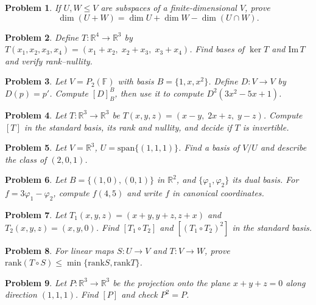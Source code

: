 \documentclass[11pt]{article}
\theoremstyle{upright}
\newtheorem{problem}{Problem}
\begin{document}
\begin{problem}
If $U,W\le V$ are subspaces of a finite-dimensional $V$, prove
\[
\dim(U+W)=\dim U+\dim W-\dim(U\cap W).
\]
\end{problem}

\begin{problem}
Define $T:\mathbb{R}^4\to\mathbb{R}^3$ by $T(x_1,x_2,x_3,x_4)=(x_1+x_2,\;x_2+x_3,\;x_3+x_4)$. 
Find bases of $\ker T$ and $\mathrm{Im}\,T$ and verify rank--nullity.
\end{problem}

\begin{problem}
Let $V=P_2(\mathbb{F})$ with basis $B=\{1,x,x^2\}$. Define $D:V\to V$ by $D(p)=p'$. 
Compute $[D]_B^B$, then use it to compute $D^2(3x^2-5x+1)$.
\end{problem}

\begin{problem}
Let $T:\mathbb{R}^3\to\mathbb{R}^3$ be $T(x,y,z)=(x-y,\;2x+z,\;y-z)$. 
Compute $[T]$ in the standard basis, its rank and nullity, and decide if $T$ is invertible.
\end{problem}

\begin{problem}
Let $V=\mathbb{R}^3$, $U=\mathrm{span}\{(1,1,1)\}$. Find a basis of $V/U$ and describe the class of $(2,0,1)$.
\end{problem}

\begin{problem}
Let $B=\{(1,0),(0,1)\}$ in $\mathbb{R}^2$, and $\{\varphi_1,\varphi_2\}$ its dual basis. For $f=3\varphi_1-\varphi_2$, compute $f(4,5)$ and write $f$ in canonical coordinates.
\end{problem}

\begin{problem}
Let $T_1(x,y,z)=(x+y,y+z,z+x)$ and $T_2(x,y,z)=(x,y,0)$. Find $[T_1\circ T_2]$ and $[(T_1\circ T_2)^2]$ in the standard basis.
\end{problem}

\begin{problem}
For linear maps $S:U\to V$ and $T:V\to W$, prove $\mathrm{rank}(T\circ S)\le \min\{\mathrm{rank} S,\mathrm{rank} T\}$.
\end{problem}

\begin{problem}
Let $P:\mathbb{R}^3\to\mathbb{R}^3$ be the projection onto the plane $x+y+z=0$ along direction $(1,1,1)$. 
Find $[P]$ and check $P^2=P$.
\end{problem}
\end{document}
